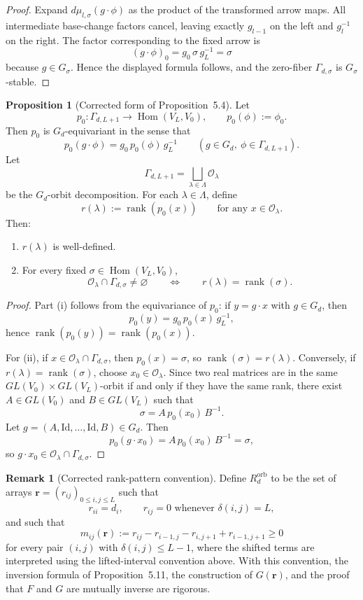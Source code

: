 \documentclass{article}
\newcommand{\Hom}{\operatorname{Hom}}
\newcommand{\rank}{\operatorname{rank}}
\theoremstyle{definition}
\newtheorem{proposition}[theorem]{Proposition}
\newtheorem{remark}[theorem]{Remark}
\begin{document}
\begin{proof}
Expand \(d\mu_{l,\sigma}(g\cdot \phi)\) as the product of the transformed arrow maps.
All intermediate base-change factors cancel, leaving exactly \(g_{l-1}\) on the left
and \(g_l^{-1}\) on the right. The factor corresponding to the fixed arrow is
\[
(g\cdot \phi)_0=g_0\,\sigma\, g_L^{-1}=\sigma
\]
because \(g\in G_\sigma\). Hence the displayed formula follows, and the zero-fiber
\(\Gamma_{d,\sigma}\) is \(G_\sigma\)-stable.
\end{proof}

\begin{proposition}[Corrected form of Proposition~5.4]
Let
\[
p_0:\Gamma_{d,L+1}\longrightarrow \Hom(V_L,V_0),
\qquad
p_0(\phi):=\phi_0 .
\]
Then \(p_0\) is \(G_d\)-equivariant in the sense that
\[
p_0(g\cdot \phi)=g_0\,p_0(\phi)\,g_L^{-1}
\qquad
(g\in G_d,\ \phi\in\Gamma_{d,L+1}).
\]
Let
\[
\Gamma_{d,L+1}=\bigsqcup_{\lambda\in\Lambda}\mathcal O_\lambda
\]
be the \(G_d\)-orbit decomposition. For each \(\lambda\in\Lambda\), define
\[
r(\lambda):=\rank(p_0(x))
\qquad \text{for any }x\in \mathcal O_\lambda .
\]
Then:
\begin{enumerate}
\item[(i)] \(r(\lambda)\) is well-defined.
\item[(ii)] For every fixed \(\sigma\in \Hom(V_L,V_0)\),
\[
\mathcal O_\lambda\cap \Gamma_{d,\sigma}\neq \varnothing
\qquad\Longleftrightarrow\qquad
r(\lambda)=\rank(\sigma).
\]
\end{enumerate}
\end{proposition}

\begin{proof}
Part (i) follows from the equivariance of \(p_0\): if \(y=g\cdot x\) with
\(g\in G_d\), then
\[
p_0(y)=g_0\,p_0(x)\,g_L^{-1},
\]
hence \(\rank(p_0(y))=\rank(p_0(x))\).

For (ii), if \(x\in \mathcal O_\lambda\cap \Gamma_{d,\sigma}\), then \(p_0(x)=\sigma\), so
\(\rank(\sigma)=r(\lambda)\). Conversely, if \(r(\lambda)=\rank(\sigma)\), choose
\(x_0\in \mathcal O_\lambda\). Since two real matrices are in the same
\(GL(V_0)\times GL(V_L)\)-orbit if and only if they have the same rank, there exist
\(A\in GL(V_0)\) and \(B\in GL(V_L)\) such that
\[
\sigma=A\,p_0(x_0)\,B^{-1}.
\]
Let \(g=(A,\mathrm{Id},\ldots,\mathrm{Id},B)\in G_d\). Then
\[
p_0(g\cdot x_0)=A\,p_0(x_0)\,B^{-1}=\sigma,
\]
so \(g\cdot x_0\in \mathcal O_\lambda\cap \Gamma_{d,\sigma}\).
\end{proof}

\begin{remark}[Corrected rank-pattern convention]
Define \(R_d^{\mathrm{orb}}\) to be the set of arrays
\(\mathbf r=(r_{ij})_{0\le i,j\le L}\) such that
\[
r_{ii}=d_i,\qquad r_{ij}=0 \text{ whenever } \delta(i,j)=L,
\]
and such that
\[
m_{ij}(\mathbf r):=
r_{ij}-r_{i-1,j}-r_{i,j+1}+r_{i-1,j+1}\ge 0
\]
for every pair \((i,j)\) with \(\delta(i,j)\le L-1\), where the shifted terms are
interpreted using the lifted-interval convention above.
With this convention, the inversion formula of Proposition~5.11, the construction of
\(G(\mathbf r)\), and the proof that \(F\) and \(G\) are mutually inverse are rigorous.
\end{remark}
\end{document}
